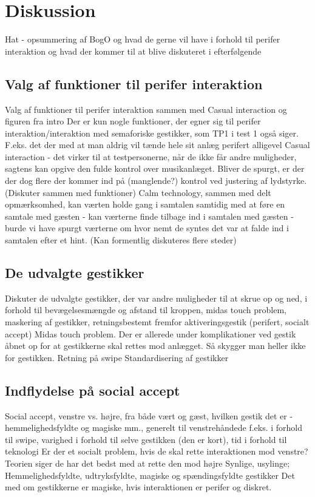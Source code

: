 \chapter{Diskussion}
\label{SamletDiskussion}
%

Hat - opsummering af BogO og hvad de gerne vil have i forhold til perifer interaktion og hvad der kommer til at blive diskuteret i efterfølgende
%
\section{Valg af funktioner til perifer interaktion}
\label{DiskussionFunktionerCasualInteraction}
%
Valg af funktioner til perifer interaktion sammen med Casual interaction og figuren fra intro 
Der er kun nogle funktioner, der egner sig til perifer interaktion/interaktion med semaforiske gestikker, som TP1 i test 1 også siger. F.eks. det der med at man aldrig vil tænde hele sit anlæg perifert alligevel 
Casual interaction - det virker til at testpersonerne, når de ikke får andre muligheder, sagtens kan opgive den fulde kontrol over musikanlæget. Bliver de spurgt, er der der dog flere der kommer ind på (manglende?) kontrol ved justering af lydstyrke. (Diskuter sammen med funktioner)\blankline
%
Calm technology, sammen med delt opmærksomhed, kan værten holde gang i samtalen samtidig med at føre en samtale med gæsten - kan værterne finde tilbage ind i samtalen med gæsten - burde vi have spurgt værterne om hvor nemt de syntes det var at falde ind i samtalen efter et hint. (Kan formentlig diskuteres flere steder) \blankline
%
\section{De udvalgte gestikker}
\label{DiskussionUdvalgteGestikker}
%
Diskuter de udvalgte gestikker, der var andre muligheder til at skrue op og ned, i forhold til bevægelsesmængde og afstand til kroppen, midas touch problem, maskering af gestikker, retningsbestemt fremfor aktiveringsgestik (perifert, socialt accept)\blankline
%
Midas touch problem. Der er allerede under komplikationer ved gestik åbnet op for at gestikkerne skal rettes mod anlægget. Så skygger man heller ikke for gestikken.\blankline
%
Retning på swipe\blankline
%
Standardisering af gestikker
%
\section{Indflydelse på social accept}
\label{DiskussionSocialAccept}
%
Social accept, venstre vs. højre, fra både vært og gæst, hvilken gestik det er - hemmelighedsfyldte og magiske mm., generelt til venstrehåndede f.eks. i forhold til swipe, varighed i forhold til selve gestikken (den er kort), tid i forhold til teknologi
 Er der et socialt problem, hvis de skal rette interaktionen mod venstre? Teorien siger de har det bedst med at rette den mod højre
 Synlige, usylinge; Hemmelighedsfyldte, udtryksfyldte, 
	magiske og spændingsfyldte gestikker
	Det med om gestikkerne er magiske, hvis interaktionen er perifer og diskret. 
%
